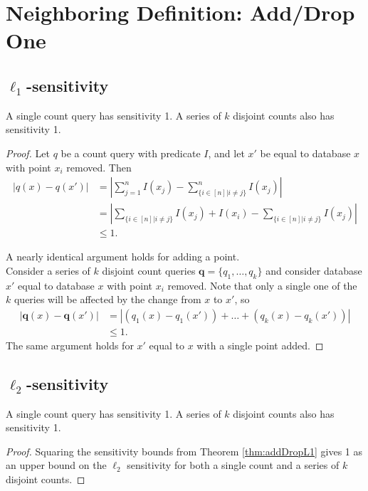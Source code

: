 \documentclass[11pt]{scrartcl} %
\begin{document}
\section{Neighboring Definition: Add/Drop One}
\subsection{$\ell_1$-sensitivity}
\begin{theorem}
\label{thm:addDropL1}
A single count query has sensitivity 1. A series of $k$ disjoint counts also has sensitivity 1.
\end{theorem}

\begin{proof}
Let $q$ be a count query with predicate $I$, and let $x'$ be equal to database $x$ with point $x_i$ removed. Then 
\begin{align*}
\left \vert q(x) - q(x') \right\vert &= \left\vert \sum_{j=1}^n I(x_j) - \sum_{\{ i \in [n] \vert i \ne j\}}^n I(x_j) \right\vert\\
	&= \left\vert \sum_{\{ i \in [n] \vert i \ne j\}} I(x_j) + I(x_i) - \sum_{\{ i \in [n] \vert i \ne j\}} I(x_j) \right\vert\\
	&\le 1.
\end{align*}

A nearly identical argument holds for adding a point. \\
Consider a series of $k$ disjoint count queries $\mathbf{q} = \{q_1, \ldots, q_k\}$ and consider database $x'$ equal to database $x$ with point $x_i$ removed. Note that only a single one of the $k$ queries will be affected by the change from $x$ to $x'$, so
\begin{align*}
\left\vert \mathbf{q}(x) - \mathbf{q}(x') \right\vert &= \left\vert \left(q_1(x) - q_1(x')\right) + \ldots + \left(q_k(x) - q_k(x')\right) \right\vert \\
	&\le 1.
\end{align*}
The same argument holds for $x'$ equal to $x$ with a single point added.
\end{proof}
\subsection{$\ell_2$-sensitivity}
\begin{theorem}
A single count query has sensitivity 1. A series of $k$ disjoint counts also has sensitivity 1.
\end{theorem}

\begin{proof}
Squaring the sensitivity bounds from Theorem \ref{thm:addDropL1} gives 1 as an upper bound on the $\ell_2$ sensitivity for both a single count and a series of $k$ disjoint counts.
\end{proof}
% 
% 
\end{document}
